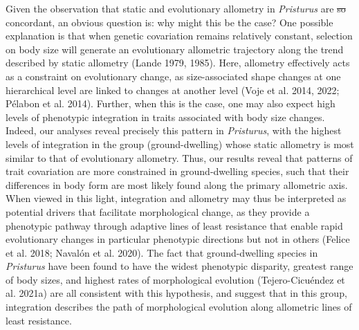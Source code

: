 \documentclass[
  11pt,
]{article}
\providecommand{\DIFaddtex}[1]{{\protect\color{blue}\uwave{#1}}} %
\providecommand{\DIFdeltex}[1]{{\protect\color{red}\sout{#1}}}                      %
\providecommand{\DIFaddbegin}{} %
\providecommand{\DIFaddend}{} %
\providecommand{\DIFdelbegin}{} %
\providecommand{\DIFdelend}{} %
\providecommand{\DIFadd}[1]{\texorpdfstring{\DIFaddtex{#1}}{#1}} %
\providecommand{\DIFdel}[1]{\texorpdfstring{\DIFdeltex{#1}}{}} %
\newcommand{\DIFscaledelfig}{0.5}
\newlength{\DIFdelgraphicswidth} %
\newlength{\DIFdelgraphicsheight} %
\newcommand{\DIFaddincludegraphics}[2][]{{\color{blue}\fbox{\DIFOincludegraphics[#1]{#2}}}} %
\newcommand{\DIFdelincludegraphics}[2][]{%
\sbox{\DIFdelgraphicsbox}{\DIFOincludegraphics[#1]{#2}}%
\settoboxwidth{\DIFdelgraphicswidth}{\DIFdelgraphicsbox} %
\settoboxtotalheight{\DIFdelgraphicsheight}{\DIFdelgraphicsbox} %
\scalebox{\DIFscaledelfig}{%
\parbox[b]{\DIFdelgraphicswidth}{\usebox{\DIFdelgraphicsbox}\\[-\baselineskip] \rule{\DIFdelgraphicswidth}{0em}}\llap{\resizebox{\DIFdelgraphicswidth}{\DIFdelgraphicsheight}{%
\setlength{\unitlength}{\DIFdelgraphicswidth}%
\begin{picture}(1,1)%
\thicklines\linethickness{2pt} %
{\color[rgb]{1,0,0}\put(0,0){\framebox(1,1){}}}%
{\color[rgb]{1,0,0}\put(0,0){\line( 1,1){1}}}%
{\color[rgb]{1,0,0}\put(0,1){\line(1,-1){1}}}%
\end{picture}%
}\hspace*{3pt}}} %
} %
\DeclareRobustCommand{\DIFaddbegin}{\DIFOaddbegin \let\includegraphics\DIFaddincludegraphics} %
\DeclareRobustCommand{\DIFaddend}{\DIFOaddend \let\includegraphics\DIFOincludegraphics} %
\DeclareRobustCommand{\DIFdelbegin}{\DIFOdelbegin \let\includegraphics\DIFdelincludegraphics} %
\DeclareRobustCommand{\DIFdelend}{\DIFOaddend \let\includegraphics\DIFOincludegraphics} %
\begin{document}
Given the observation that static and evolutionary allometry in
\emph{Pristurus} are \DIFdelbegin \DIFdel{so }\DIFdelend \DIFaddbegin \DIFadd{largely }\DIFaddend concordant, an obvious question is: why
might this be the case? One possible explanation is that when genetic
covariation remains relatively constant, selection on body size will
generate an evolutionary allometric trajectory along the trend described
by static allometry (Lande 1979, 1985). Here, allometry effectively acts
as a constraint on evolutionary change, as size-associated shape changes
at one hierarchical level are linked to changes at another level (Voje
et al. 2014, 2022; Pélabon et al. 2014). Further, when this is the case,
one may also expect high levels of phenotypic integration in traits
associated with body size changes. Indeed, our analyses reveal precisely
this pattern in \emph{Pristurus}, with the highest levels of integration
in the group (ground-dwelling) whose static allometry is most similar to
that of evolutionary allometry. Thus, our results reveal that patterns
of trait covariation are more constrained in ground-dwelling species,
such that their differences in body form are most likely found along the
primary allometric axis. When viewed in this light, integration and
allometry may thus be interpreted as potential drivers that facilitate
morphological change, as they provide a phenotypic pathway through
adaptive lines of least resistance that enable rapid evolutionary
changes in particular phenotypic directions but not in others (Felice et
al. 2018; Navalón et al. 2020). The fact that ground-dwelling species in
\emph{Pristurus} have been found to have the widest phenotypic
disparity, greatest range of body sizes, and highest rates of
morphological evolution (Tejero-Cicuéndez et al. 2021a) are all
consistent with this hypothesis, and suggest that in this group,
integration describes the path of morphological evolution along
allometric lines of least resistance. \hfill\break
\end{document}
